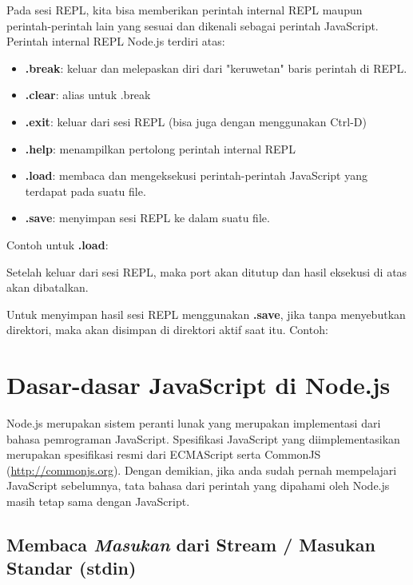 Pada sesi REPL, kita bisa memberikan perintah internal REPL maupun perintah-perintah lain yang sesuai dan dikenali sebagai perintah JavaScript. Perintah internal REPL Node.js terdiri atas:
\begin{itemize}
  \item \textbf{.break}: keluar dan melepaskan diri dari "keruwetan" baris perintah di REPL.
  \item \textbf{.clear}: alias untuk .break
  \item \textbf{.exit}: keluar dari sesi REPL (bisa juga dengan menggunakan Ctrl-D)
  \item \textbf{.help}: menampilkan pertolong perintah internal REPL
  \item \textbf{.load}: membaca dan mengeksekusi perintah-perintah JavaScript yang terdapat pada suatu file.
  \item \textbf{.save}: menyimpan sesi REPL ke dalam suatu file.
\end{itemize}

Contoh untuk \textbf{.load}:

\lstset{language=JavaScript,caption=Contoh penggunaan .load dalam REPL}


Setelah keluar dari sesi REPL, maka port akan ditutup dan hasil eksekusi di atas akan dibatalkan. 

Untuk menyimpan hasil sesi REPL menggunakan \textbf{.save}, jika tanpa menyebutkan direktori, maka akan disimpan di direktori aktif saat itu. Contoh:
\lstset{language=bash,caption=Contoh penggunaan perintah .save di sesi REPL}


\section{Dasar-dasar JavaScript di Node.js}

Node.js merupakan sistem peranti lunak yang merupakan implementasi dari bahasa pemrograman JavaScript. Spesifikasi JavaScript yang diimplementasikan merupakan spesifikasi resmi dari ECMAScript serta CommonJS (\url{http://commonjs.org}). Dengan demikian, jika anda sudah pernah mempelajari JavaScript sebelumnya, tata bahasa dari perintah yang dipahami oleh Node.js masih tetap sama dengan JavaScript. 

\subsection{Membaca \textit{Masukan} dari Stream / Masukan Standar (stdin)}

